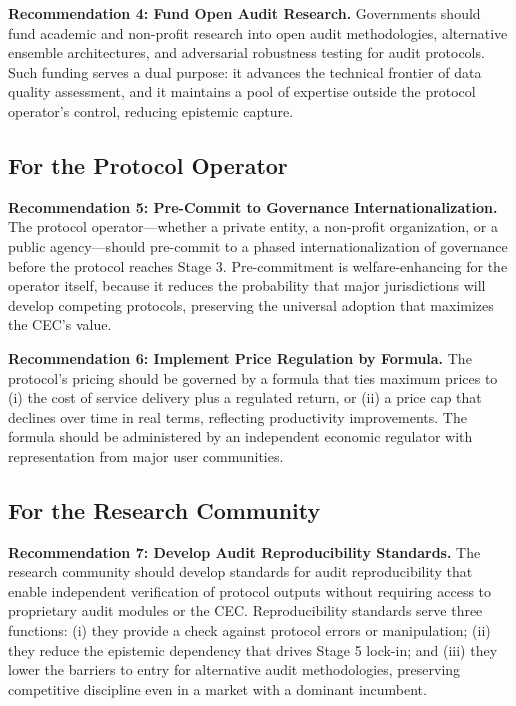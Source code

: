 \documentclass[12pt,a4paper]{ctexart}
\theoremstyle{definition}
\theoremstyle{remark}
\begin{document}
\textbf{Recommendation 4: Fund Open Audit Research.} Governments should fund academic and non-profit research into open audit methodologies, alternative ensemble architectures, and adversarial robustness testing for audit protocols. Such funding serves a dual purpose: it advances the technical frontier of data quality assessment, and it maintains a pool of expertise outside the protocol operator's control, reducing epistemic capture.

\subsection{For the Protocol Operator}

\textbf{Recommendation 5: Pre-Commit to Governance Internationalization.} The protocol operator—whether a private entity, a non-profit organization, or a public agency—should pre-commit to a phased internationalization of governance before the protocol reaches Stage 3. Pre-commitment is welfare-enhancing for the operator itself, because it reduces the probability that major jurisdictions will develop competing protocols, preserving the universal adoption that maximizes the CEC's value.

\textbf{Recommendation 6: Implement Price Regulation by Formula.} The protocol's pricing should be governed by a formula that ties maximum prices to (i) the cost of service delivery plus a regulated return, or (ii) a price cap that declines over time in real terms, reflecting productivity improvements. The formula should be administered by an independent economic regulator with representation from major user communities.

\subsection{For the Research Community}

\textbf{Recommendation 7: Develop Audit Reproducibility Standards.} The research community should develop standards for audit reproducibility that enable independent verification of protocol outputs without requiring access to proprietary audit modules or the CEC. Reproducibility standards serve three functions: (i) they provide a check against protocol errors or manipulation; (ii) they reduce the epistemic dependency that drives Stage 5 lock-in; and (iii) they lower the barriers to entry for alternative audit methodologies, preserving competitive discipline even in a market with a dominant incumbent.
\end{document}
